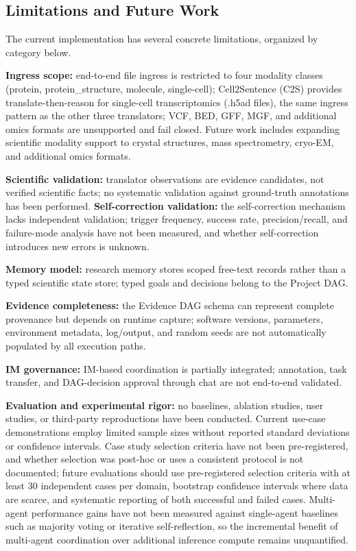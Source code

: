 \documentclass[sn-basic,Numbered,pdflatex]{sn-jnl}
\begin{document}
\subsection{Limitations and Future Work}

The current implementation has several concrete limitations, organized by category below.

\textbf{Ingress scope:} end-to-end file ingress is restricted to four modality classes (protein, protein\_structure, molecule, single-cell); Cell2Sentence (C2S) provides translate-then-reason for single-cell transcriptomics (.h5ad files), the same ingress pattern as the other three translators; VCF, BED, GFF, MGF, and additional omics formats are unsupported and fail closed. Future work includes expanding scientific modality support to crystal structures, mass spectrometry, cryo-EM, and additional omics formats.

\textbf{Scientific validation:} translator observations are evidence candidates, not verified scientific facts; no systematic validation against ground-truth annotations has been performed. \textbf{Self-correction validation:} the self-correction mechanism lacks independent validation; trigger frequency, success rate, precision/recall, and failure-mode analysis have not been measured, and whether self-correction introduces new errors is unknown.

\textbf{Memory model:} research memory stores scoped free-text records rather than a typed scientific state store; typed goals and decisions belong to the Project DAG.

\textbf{Evidence completeness:} the Evidence DAG schema can represent complete provenance but depends on runtime capture; software versions, parameters, environment metadata, log/output, and random seeds are not automatically populated by all execution paths.

\textbf{IM governance:} IM-based coordination is partially integrated; annotation, task transfer, and DAG-decision approval through chat are not end-to-end validated.

\textbf{Evaluation and experimental rigor:} no baselines, ablation studies, user studies, or third-party reproductions have been conducted. Current use-case demonstrations employ limited sample sizes without reported standard deviations or confidence intervals. Case study selection criteria have not been pre-registered, and whether selection was post-hoc or uses a consistent protocol is not documented; future evaluations should use pre-registered selection criteria with at least 30 independent cases per domain, bootstrap confidence intervals where data are scarce, and systematic reporting of both successful and failed cases. Multi-agent performance gains have not been measured against single-agent baselines such as majority voting or iterative self-reflection, so the incremental benefit of multi-agent coordination over additional inference compute remains unquantified.
\end{document}

